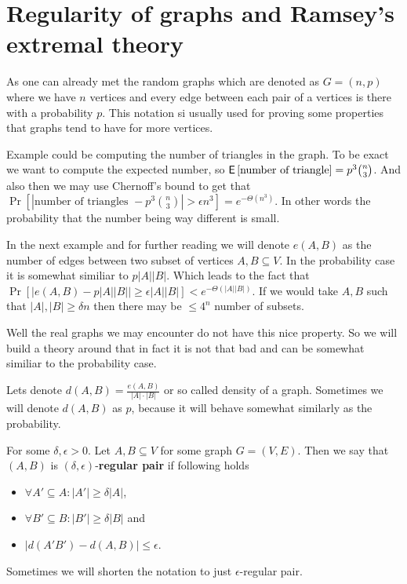\chapter{Regularity of graphs and Ramsey's extremal theory}

As one can already met the random graphs which are denoted as $G = (n,p)$ where we have $n$ vertices and every edge between each pair of a vertices is there with a probability $p$. This notation si usually used for proving some properties that graphs tend to have for more vertices.

Example could be computing the number of triangles in the graph. To be exact we want to compute the expected number, so $\operatorname{\textsf{E}\,} [\text{number of triangle}] = p^3 \binom{n}{3}$. And also then we may use Chernoff's bound to get that $\Pr [|\text{number of triangles } - p^3 \binom{n}{3}| > \epsilon n^3] = e^{-\Theta(n^3)}$. In other words the probability that the number being way different is small.

In the next example and for further reading we will denote $e(A,B)$ as the number of edges between two subset of vertices $A, B \subseteq V$. In the probability case it is somewhat similiar to $p |A| |B|$. Which leads to the fact that $\Pr [|e(A,B) - p|A||B|| \geq \epsilon |A||B|] < e^{-\Theta(|A||B|)}$. If we would take $A, B$ such that $|A|, |B| \geq \delta n$ then there may be $\leq 4^n$ number of subsets.

Well the real graphs we may encounter do not have this nice property. So we will build a theory around that in fact it is not that bad and can be somewhat similiar to the probability case.

\begin{defn}
	Lets denote $d(A,B) = \frac{e(A,B)}{|A| \cdot |B|}$ or so called density of a graph. Sometimes we will denote $d(A,B)$ as $p$, because it will behave somewhat similarly as the probability.
\end{defn}

\begin{defn}
	For some $\delta, \epsilon > 0$. Let $A, B \subseteq V$ for some graph $G = (V,E)$. Then we say that $(A,B)$ is $(\delta, \epsilon)$-\textbf{regular pair} if following holds
	
	\begin{itemize}
		\item $\forall A' \subseteq A : |A'| \geq \delta |A|$,
		\item $\forall B' \subseteq B : |B'| \geq \delta |B|$ and
		\item $|d(A'B') - d(A,B)| \leq \epsilon$.
	\end{itemize}
	
	Sometimes we will shorten the notation to just $\epsilon$-regular pair.
\end{defn}

